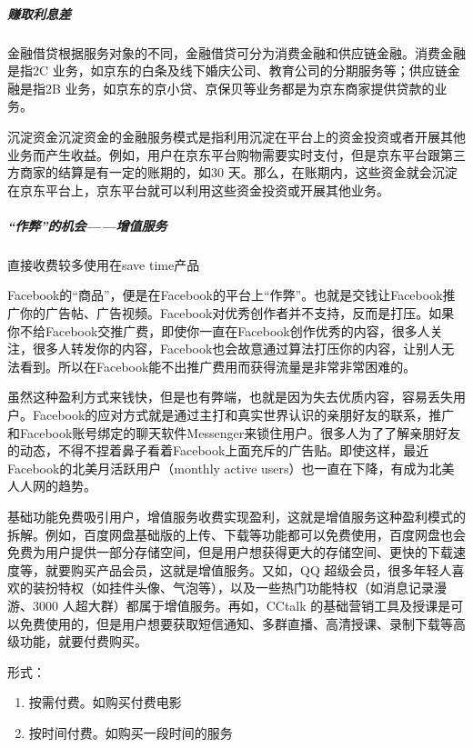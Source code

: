 \documentclass[letterpaper,10pt,english]{sphinxmanual}
\begin{document}
\subparagraph{赚取利息差}
\label{\detokenize{chapter_introduction/money:id13}}
金融借贷根据服务对象的不同，金融借贷可分为消费金融和供应链金融。消费金融是指2C
业务，如京东的白条及线下婚庆公司、教育公司的分期服务等；供应链金融是指2B
业务，如京东的京小贷、京保贝等业务都是为京东商家提供贷款的业务。

沉淀资金沉淀资金的金融服务模式是指利用沉淀在平台上的资金投资或者开展其他业务而产生收益。例如，用户在京东平台购物需要实时支付，但是京东平台跟第三方商家的结算是有一定的账期的，如30
天。那么，在账期内，这些资金就会沉淀在京东平台上，京东平台就可以利用这些资金投资或开展其他业务。


\subparagraph{“作弊”的机会——增值服务}
\label{\detokenize{chapter_introduction/money:id14}}
直接收费较多使用在save time产品

Facebook的“商品”，便是在Facebook的平台上“作弊”。也就是交钱让Facebook推广你的广告帖、广告视频。Facebook对优秀创作者并不支持，反而是打压。如果你不给Facebook交推广费，即使你一直在Facebook创作优秀的内容，很多人关注，很多人转发你的内容，Facebook也会故意通过算法打压你的内容，让别人无法看到。所以在Facebook能不出推广费用而获得流量是非常非常困难的。

虽然这种盈利方式来钱快，但是也有弊端，也就是因为失去优质内容，容易丢失用户。Facebook的应对方式就是通过主打和真实世界认识的亲朋好友的联系，推广和Facebook账号绑定的聊天软件Messenger来锁住用户。很多人为了了解亲朋好友的动态，不得不捏着鼻子看着Facebook上面充斥的广告贴。即使这样，最近Facebook的北美月活跃用户（monthly
active users）也一直在下降，有成为北美人人网的趋势。

基础功能免费吸引用户，增值服务收费实现盈利，这就是增值服务这种盈利模式的拆解。例如，百度网盘基础版的上传、下载等功能都可以免费使用，百度网盘也会免费为用户提供一部分存储空间，但是用户想获得更大的存储空间、更快的下载速度等，就要购买产品会员，这就是增值服务。又如，QQ
超级会员，很多年轻人喜欢的装扮特权（如挂件头像、气泡等），以及一些热门功能特权（如消息记录漫游、3000
人超大群）都属于增值服务。再如，CCtalk
的基础营销工具及授课是可以免费使用的，但是用户想要获取短信通知、多群直播、高清授课、录制下载等高级功能，就要付费购买。

形式：
\begin{enumerate}
%
\item {} 
按需付费。如购买付费电影

\item {} 
按时间付费。如购买一段时间的服务

\end{enumerate}
\end{document}
